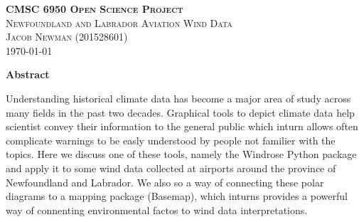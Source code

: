 \documentclass{article}
\begin{document}
\begin{titlepage}
\newcommand{\HRule}{\rule{\linewidth}{0.5mm}}

\center
\textsc{\LARGE \textbf{CMSC 6950 Open Science Project}}\\[1 cm]

\textsc{\Large Newfoundland and Labrador Aviation Wind Data}\\[0.5 cm]

\textsc{\large Jacob Newman (201528601)}\\[0.5 cm]





\vfill\vfill\vfill
{\large\today}
\vfill

\end{titlepage}

\begin{center}
\bf{Abstract}

Understanding historical climate data has become a major area of study across many fields in the past two decades. Graphical tools to depict climate data help scientist convey their information to the 
general public which inturn allows often complicate warnings to be easly understood by people not familier with the topics. Here we discuss one of these tools, namely the Windrose Python package and 
apply it to some wind data collected at airports around the province of Newfoundland and Labrador. We also so a way of connecting these polar diagrams to a mapping package (Basemap), which inturns 
provides a powerful way of connenting environmental factos to wind data interpretations.  

\end{center}
\end{document}
